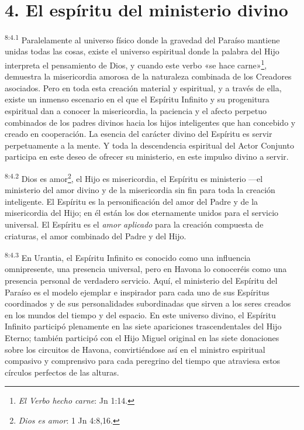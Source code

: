 \section*{4. El espíritu del ministerio divino}
\par
\textsuperscript{8:4.1} Paralelamente al universo físico donde la gravedad del Paraíso mantiene unidas todas las cosas, existe el universo espiritual donde la palabra del Hijo interpreta el pensamiento de Dios, y cuando este verbo «se hace carne»\footnote{\textit{El Verbo hecho carne}: Jn 1:14.}, demuestra la misericordia amorosa de la naturaleza combinada de los Creadores asociados. Pero en toda esta creación material y espiritual, y a través de ella, existe un inmenso escenario en el que el Espíritu Infinito y su progenitura espiritual dan a conocer la misericordia, la paciencia y el afecto perpetuo combinados de los padres divinos hacia los hijos inteligentes que han concebido y creado en cooperación. La esencia del carácter divino del Espíritu es servir perpetuamente a la mente. Y toda la descendencia espiritual del Actor Conjunto participa en este deseo de ofrecer su ministerio, en este impulso divino a servir.

\par
\textsuperscript{8:4.2} Dios es amor\footnote{\textit{Dios es amor}: 1 Jn 4:8,16.}, el Hijo es misericordia, el Espíritu es ministerio ---el ministerio del amor divino y de la misericordia sin fin para toda la creación inteligente. El Espíritu es la personificación del amor del Padre y de la misericordia del Hijo; en él están los dos eternamente unidos para el servicio universal. El Espíritu es el \textit{amor aplicado} para la creación compuesta de criaturas, el amor combinado del Padre y del Hijo.

\par
\textsuperscript{8:4.3} En Urantia, el Espíritu Infinito es conocido como una influencia omnipresente, una presencia universal, pero en Havona lo conoceréis como una presencia personal de verdadero servicio. Aquí, el ministerio del Espíritu del Paraíso es el modelo ejemplar e inspirador para cada uno de sus Espíritus coordinados y de sus personalidades subordinadas que sirven a los seres creados en los mundos del tiempo y del espacio. En este universo divino, el Espíritu Infinito participó plenamente en las siete apariciones trascendentales del Hijo Eterno; también participó con el Hijo Miguel original en las siete donaciones sobre los circuitos de Havona, convirtiéndose así en el ministro espiritual compasivo y comprensivo para cada peregrino del tiempo que atraviesa estos círculos perfectos de las alturas.

